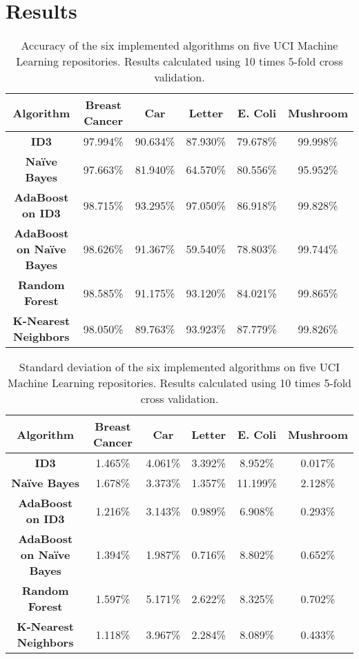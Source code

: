 \documentclass[11pt]{article}
\newcommand{\bb}{\textbf}
\begin{document}
\section{Results}
\begin{table} [!htbp]
  \begin{tabular}{ |c|c|c|c|c|c| }
    \hline
    \bb{Algorithm}               & \bb{Breast Cancer} & \bb{Car} & \bb{Letter} & \bb{E. Coli}  & \bb{Mushroom} \\ \hline
    \bb{ID3}                     & 97.994\%           & 90.634\% & 87.930\%    & 79.678\%      & 99.998\%      \\ \hline
    \bb{Naïve Bayes}             & 97.663\%           & 81.940\% & 64.570\%    & 80.556\%      & 95.952\%      \\ \hline
    \bb{AdaBoost on ID3}         & 98.715\%           & 93.295\% & 97.050\%    & 86.918\%      & 99.828\%      \\ \hline
    \bb{AdaBoost on Naïve Bayes} & 98.626\%           & 91.367\% & 59.540\%    & 78.803\%      & 99.744\%      \\ \hline
    \bb{Random Forest}           & 98.585\%           & 91.175\% & 93.120\%    & 84.021\%      & 99.865\%      \\ \hline
    \bb{K-Nearest Neighbors}     & 98.050\%           & 89.763\% & 93.923\%    & 87.779\%      & 99.826\%      \\ \hline
  \end{tabular}
  \caption{Accuracy of the six implemented algorithms on five UCI Machine Learning repositories. Results calculated using 10 times 5-fold cross validation.}
  \label{table:accuracies}
\end{table}

\begin{table} [!htbp]
  \begin{tabular}{ |c|c|c|c|c|c| }
    \hline
    \bb{Algorithm}               & \bb{Breast Cancer} & \bb{Car} & \bb{Letter} & \bb{E. Coli}  & \bb{Mushroom} \\ \hline
    \bb{ID3}                     & 1.465\%            & 4.061\%  & 3.392\%     & 8.952\%       & 0.017\%       \\ \hline
    \bb{Naïve Bayes}             & 1.678\%            & 3.373\%  & 1.357\%     & 11.199\%      & 2.128\%       \\ \hline
    \bb{AdaBoost on ID3}         & 1.216\%            & 3.143\%  & 0.989\%     & 6.908\%       & 0.293\%       \\ \hline
    \bb{AdaBoost on Naïve Bayes} & 1.394\%            & 1.987\%  & 0.716\%     & 8.802\%       & 0.652\%       \\ \hline
    \bb{Random Forest}           & 1.597\%            & 5.171\%  & 2.622\%     & 8.325\%       & 0.702\%       \\ \hline
    \bb{K-Nearest Neighbors}     & 1.118\%            & 3.967\%  & 2.284\%     & 8.089\%       & 0.433\%       \\ \hline
  \end{tabular}
  \caption{Standard deviation of the six implemented algorithms on five UCI Machine Learning repositories. Results calculated using 10 times 5-fold cross validation.}
\end{table}
\end{document}
